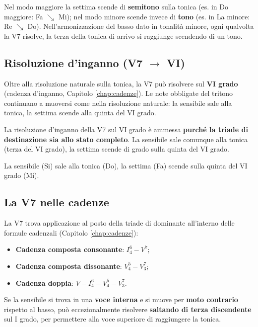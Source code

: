 \begin{osservazione}
	Nel modo maggiore la settima scende di \textbf{semitono} sulla tonica (es. in Do maggiore: Fa $\searrow$ Mi); nel modo minore scende invece di \textbf{tono} (es. in La minore: Re $\searrow$ Do). Nell'armonizzazione del basso dato in tonalità minore, ogni qualvolta la V7 risolve, la terza della tonica di arrivo si raggiunge scendendo di un tono.
\end{osservazione}

\subsection{Risoluzione d'inganno (V7 $\rightarrow$ VI)}
\label{sec:v7_inganno}

Oltre alla risoluzione naturale sulla tonica, la V7 può risolvere sul \textbf{VI grado} (cadenza d'inganno, Capitolo \ref{chap:cadenze}). Le note obbligate del tritono continuano a muoversi come nella risoluzione naturale: la sensibile sale alla tonica, la settima scende alla quinta del VI grado.

\begin{regola}[V7 $\rightarrow$ VI]
	\label{reg:v7_inganno}
	La risoluzione d'inganno della V7 sul VI grado è ammessa \textbf{purché la triade di destinazione sia allo stato completo}. La sensibile sale comunque alla tonica (terza del VI grado), la settima scende di grado sulla quinta del VI grado.
\end{regola}

\begin{esempio}
	\label{ex:v7_inganno}
	La sensibile (Si) sale alla tonica (Do), la settima (Fa) scende sulla quinta del VI grado (Mi).
\end{esempio}

\subsection{La V7 nelle cadenze}
\label{sec:v7_cadenze}

La V7 trova applicazione al posto della triade di dominante all'interno delle formule cadenzali (Capitolo \ref{chap:cadenze}):

\begin{itemize}
	\item \textbf{Cadenza composta consonante}: $I^6_4 - V^7$;
	\item \textbf{Cadenza composta dissonante}: $V^5_4 - V^7_3$;
	\item \textbf{Cadenza doppia}: $V - I^6_4 - V^5_4 - V^7_3$.
\end{itemize}

\begin{osservazione}
	\label{oss:eccezione_bach}
	Se la sensibile si trova in una \textbf{voce interna} e si muove per \textbf{moto contrario} rispetto al basso, può eccezionalmente risolvere \textbf{saltando di terza discendente} sul I grado, per permettere alla voce superiore di raggiungere la tonica.
\end{osservazione}
